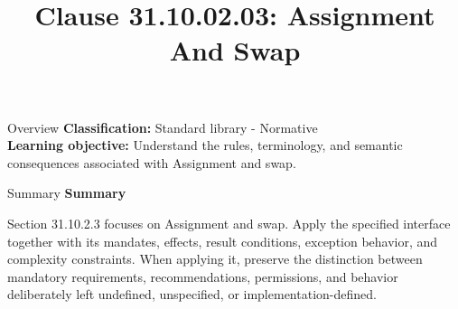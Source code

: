 \documentclass[10pt,letterpaper]{article}
\title{Clause 31.10.02.03: Assignment And Swap}
\author{}
\date{}
\begin{document}
\maketitle
\begin{CornellOverviewBox}{Overview}
\textbf{Classification:} Standard library - Normative\\[2pt]
\textbf{Learning objective:} Understand the rules, terminology, and semantic consequences associated with Assignment and swap.
\end{CornellOverviewBox}\begin{CornellSummaryBox}{Summary}
{\sffamily\bfseries\color{Accent} Summary}\par\vspace{3pt}Section 31.10.2.3 focuses on Assignment and swap. Apply the specified interface together with its mandates, effects, result conditions, exception behavior, and complexity constraints. When applying it, preserve the distinction between mandatory requirements, recommendations, permissions, and behavior deliberately left undefined, unspecified, or implementation-defined.
\end{CornellSummaryBox}
\end{document}
